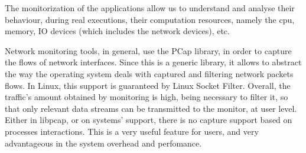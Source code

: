 \abstract 




The monitorization of the applications allow us to understand and analyse their behaviour, during real executions, their computation resources, namely the cpu, memory, IO devices (which includes the network devices), etc.

Network monitoring tools, in general, use the PCap library, in order to capture the flows of network interfaces.
Since this is a generic library, it allows to abstract the way the operating system deals with captured and filtering network packets flows.
In Linux, this support is guaranteed by Linux Socket Filter.
Overall, the traffic’s amount obtained by monitoring is high, being necessary to filter it, so that only relevant data streams can be transmitted to the monitor, at user level.
Either in libpcap, or on systems’ support, there is no capture support based on processes interactions.
This is a very useful feature for users, and very advantageous in the system overhead and perfomance.
 
